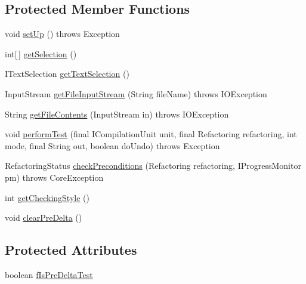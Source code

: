 \subsection*{Protected Member Functions}
\begin{DoxyCompactItemize}
\item 
void \hyperlink{classorg_1_1eclipse_1_1jdt_1_1ui_1_1tests_1_1refactoring_1_1infra_1_1AbstractSelectionTestCase_afa623e665ca6449172495129f9671f1f}{setUp} ()  throws Exception 
\item 
int\mbox{[}$\,$\mbox{]} \hyperlink{classorg_1_1eclipse_1_1jdt_1_1ui_1_1tests_1_1refactoring_1_1infra_1_1AbstractSelectionTestCase_a45dd3bd91b81741785f4fc7a073423c4}{getSelection} ()
\item 
ITextSelection \hyperlink{classorg_1_1eclipse_1_1jdt_1_1ui_1_1tests_1_1refactoring_1_1infra_1_1AbstractSelectionTestCase_acc852dbf404c1d71b07d59df5f822fae}{getTextSelection} ()
\item 
InputStream \hyperlink{classorg_1_1eclipse_1_1jdt_1_1ui_1_1tests_1_1refactoring_1_1infra_1_1AbstractSelectionTestCase_a364631380a7cc9fd8cf1d8e9b5de1203}{getFileInputStream} (String fileName)  throws IOException 
\item 
String \hyperlink{classorg_1_1eclipse_1_1jdt_1_1ui_1_1tests_1_1refactoring_1_1infra_1_1AbstractSelectionTestCase_ae437aa33d8cb498dc086f0eb5e3dc5bf}{getFileContents} (InputStream in)  throws IOException 
\item 
void \hyperlink{classorg_1_1eclipse_1_1jdt_1_1ui_1_1tests_1_1refactoring_1_1infra_1_1AbstractSelectionTestCase_acc8202e16b4e0ae0c820babdf3130d05}{performTest} (final ICompilationUnit unit, final Refactoring refactoring, int mode, final String out, boolean doUndo)  throws Exception 
\item 
RefactoringStatus \hyperlink{classorg_1_1eclipse_1_1jdt_1_1ui_1_1tests_1_1refactoring_1_1infra_1_1AbstractSelectionTestCase_a38eaa47f10cbc3eede9e17ca00e8646b}{checkPreconditions} (Refactoring refactoring, IProgressMonitor pm)  throws CoreException 
\item 
int \hyperlink{classorg_1_1eclipse_1_1jdt_1_1ui_1_1tests_1_1refactoring_1_1infra_1_1AbstractSelectionTestCase_aafe20ade6f1fcc1330841c9da4f89e49}{getCheckingStyle} ()
\item 
void \hyperlink{classorg_1_1eclipse_1_1jdt_1_1ui_1_1tests_1_1refactoring_1_1infra_1_1AbstractSelectionTestCase_a7572d65fbb489fba7c433d2db1a59ab0}{clearPreDelta} ()
\end{DoxyCompactItemize}
\subsection*{Protected Attributes}
\begin{DoxyCompactItemize}
\item 
boolean \hyperlink{classorg_1_1eclipse_1_1jdt_1_1ui_1_1tests_1_1refactoring_1_1infra_1_1AbstractSelectionTestCase_ae733270535b4b83e0498a76a251bf7e9}{fIsPreDeltaTest}
\end{DoxyCompactItemize}
